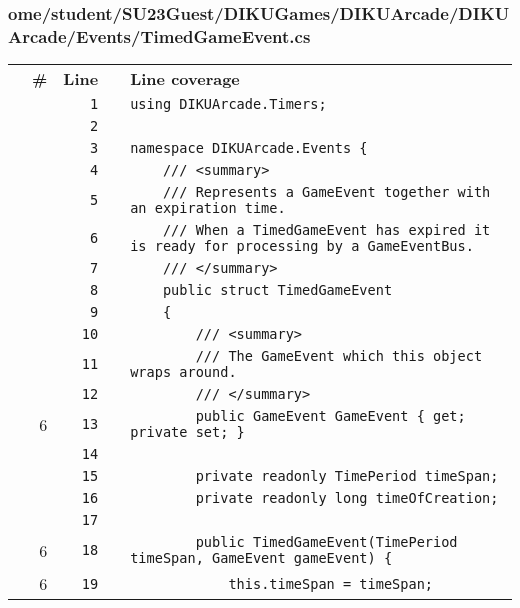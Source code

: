 \documentclass[a4paper,landscape,10pt]{article}
\begin{document}
\subsubsection{ome/student/SU23Guest/DIKUGames/DIKUArcade/DIKUArcade/Events/TimedGameEvent.cs}
\begin{longtable}[l]{lrrll}
\textbf{} & \textbf{\#} & \textbf{Line} & \textbf{} & \textbf{Line coverage}\\
\cellcolor{gray} &  & \verb~1~ & & \verb~using DIKUArcade.Timers;~\\
\cellcolor{gray} &  & \verb~2~ & & \verb~~\\
\cellcolor{gray} &  & \verb~3~ & & \verb~namespace DIKUArcade.Events {~\\
\cellcolor{gray} &  & \verb~4~ & & \verb~    /// <summary>~\\
\cellcolor{gray} &  & \verb~5~ & & \verb~    /// Represents a GameEvent together with an expiration time.~\\
\cellcolor{gray} &  & \verb~6~ & & \verb~    /// When a TimedGameEvent has expired it is ready for processing by a GameEventBus.~\\
\cellcolor{gray} &  & \verb~7~ & & \verb~    /// </summary>~\\
\cellcolor{gray} &  & \verb~8~ & & \verb~    public struct TimedGameEvent~\\
\cellcolor{gray} &  & \verb~9~ & & \verb~    {~\\
\cellcolor{gray} &  & \verb~10~ & & \verb~        /// <summary>~\\
\cellcolor{gray} &  & \verb~11~ & & \verb~        /// The GameEvent which this object wraps around.~\\
\cellcolor{gray} &  & \verb~12~ & & \verb~        /// </summary>~\\
\cellcolor{green} & 6 & \verb~13~ & & \verb~        public GameEvent GameEvent { get; private set; }~\\
\cellcolor{gray} &  & \verb~14~ & & \verb~~\\
\cellcolor{gray} &  & \verb~15~ & & \verb~        private readonly TimePeriod timeSpan;~\\
\cellcolor{gray} &  & \verb~16~ & & \verb~        private readonly long timeOfCreation;~\\
\cellcolor{gray} &  & \verb~17~ & & \verb~~\\
\cellcolor{green} & 6 & \verb~18~ & & \verb~        public TimedGameEvent(TimePeriod timeSpan, GameEvent gameEvent) {~\\
\cellcolor{green} & 6 & \verb~19~ & & \verb~            this.timeSpan = timeSpan;~\\

\end{longtable}
\end{document}
